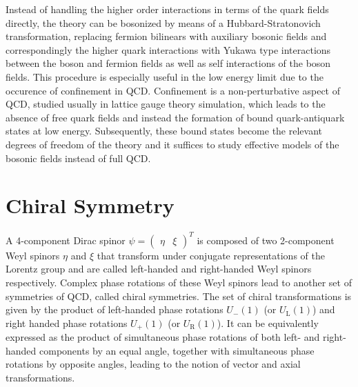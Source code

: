 Instead of handling the higher order interactions in terms of the quark fields directly, the theory can be bosonized by means of a Hubbard-Stratonovich transformation, replacing fermion bilinears with auxiliary bosonic fields and correspondingly the higher quark interactions with Yukawa type interactions between the boson and fermion fields as well as self interactions of the boson fields. This procedure is especially useful in the low energy limit due to the occurence of confinement in QCD. Confinement is a non-perturbative aspect of QCD, studied usually in lattice gauge theory simulation, which leads to the absence of free quark fields and instead the formation of bound quark-antiquark states at low energy. Subsequently, these bound states become the relevant degrees of freedom of the theory and it suffices to study effective models of the bosonic fields instead of full QCD. 


\section{Chiral Symmetry}
\label{sec:ConservedCurrentsChirSym}

A 4-component Dirac spinor ${\psi=\begin{pmatrix}\eta&\xi\end{pmatrix}}^T$ is composed of two 2-component Weyl spinors $\eta$ and $\xi$ that transform under conjugate representations of the Lorentz group and are called left-handed and right-handed Weyl spinors respectively. Complex phase rotations of these Weyl spinors lead to another set of symmetries of QCD, called chiral symmetries. The set of chiral transformations is given by the product of left-handed phase rotations ${U_-(1)}$ (or ${U_{\text{L}}(1)}$) and right handed phase rotations ${U_+(1)}$ (or ${U_{\text{R}}(1)}$). It can be equivalently expressed as the product of simultaneous phase rotations of both left- and right-handed components by an equal angle, together with simultaneous phase rotations by opposite angles, leading to the notion of vector and axial transformations.

